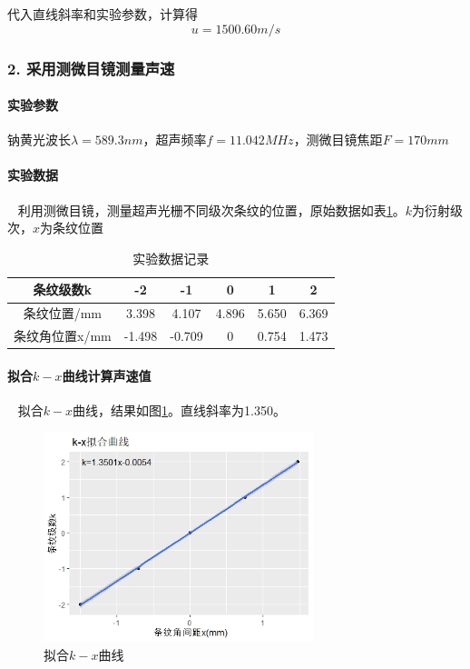 \documentclass[12pt,a4paper,UTF8]{ctexart}
\begin{document}
		代入直线斜率和实验参数，计算得
		$$
		u = 1500.60 m/s
		$$


\subsubsection*{2. 采用测微目镜测量声速}
		\paragraph{实验参数} 钠黄光波长$\lambda = 589.3 nm$，超声频率$f = 11.042 MHz$，测微目镜焦距$F = 170mm$
		\paragraph{实验数据}~
		\newline
		\indent
		利用测微目镜，测量超声光栅不同级次条纹的位置，原始数据如表\ref{tab:2}。$k$为衍射级次，$x$为条纹位置

\begin{table}[htbp]
	\centering
	\caption{实验数据记录}
	\begin{tabular}[width=textwidth]{cccccc}
	\toprule
	条纹级数k    & -2 & -1  & 0 & 1 & 2 \\
	\midrule
	条纹位置/mm    & 3.398 & 4.107 & 4.896 & 5.650 & 6.369 \\
	条纹角位置x/mm   & -1.498 & -0.709 & 0 & 0.754 & 1.473 \\
	\bottomrule
	\end{tabular}
	\label{tab:2}
\end{table}

\paragraph{拟合$k-x$曲线计算声速值}~
		\newline
		\indent
		拟合$k-x$曲线，结果如图\ref{fig:2}。直线斜率为1.350。
		\begin{figure}[htbp]
			\centering
			\includegraphics[width=0.7\textwidth]{img/curve2.jpeg}
			\caption{拟合$k-x$曲线}
			\label{fig:2}
		\end{figure}
		
\end{document}
